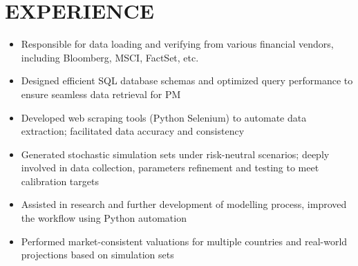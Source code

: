 \documentclass[cmu]{resume}
\begin{document}
    \section{EXPERIENCE}
    \begin{itemize}
        \item Responsible for data loading and verifying from various financial vendors, including Bloomberg, MSCI, FactSet, etc.
        \item Designed efficient SQL database schemas and optimized query performance to ensure seamless data retrieval for PM
        \item Developed web scraping tools (Python Selenium) to automate data extraction; facilitated data accuracy and consistency
    \end{itemize}

    \begin{itemize}
        \item Generated stochastic simulation sets under risk-neutral scenarios; deeply involved in data collection, parameters refinement and testing to meet calibration targets
        \item Assisted in research and further development of modelling process, improved the workflow using Python automation
        \item Performed market-consistent valuations for multiple countries and real-world projections based on simulation sets
    \end{itemize}
\end{document}
